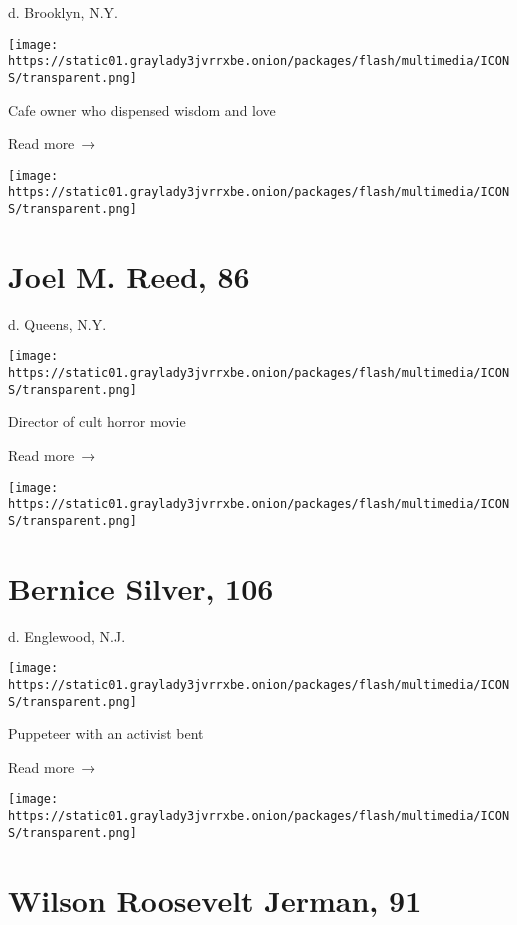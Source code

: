 d. Brooklyn, N.Y.

\texttt{[image: https://static01.graylady3jvrrxbe.onion/packages/flash/multimedia/ICONS/transparent.png]}

Cafe owner who dispensed wisdom and love

 Read more~→

\href{https://www.nytimes3xbfgragh.onion/2020/05/22/obituaries/joel-m-reed-dead-coronavirus.html}{}

\texttt{[image: https://static01.graylady3jvrrxbe.onion/packages/flash/multimedia/ICONS/transparent.png]}

\hypertarget{joel-m-reed-86}{%
\section{Joel M. Reed, 86}\label{joel-m-reed-86}}

d. Queens, N.Y.

\texttt{[image: https://static01.graylady3jvrrxbe.onion/packages/flash/multimedia/ICONS/transparent.png]}

Director of cult horror movie

 Read more~→

\href{https://www.nytimes3xbfgragh.onion/2020/05/21/obituaries/bernice-silver-dead-coronavirus.html}{}

\texttt{[image: https://static01.graylady3jvrrxbe.onion/packages/flash/multimedia/ICONS/transparent.png]}

\hypertarget{bernice-silver-106}{%
\section{Bernice Silver, 106}\label{bernice-silver-106}}

d. Englewood, N.J.

\texttt{[image: https://static01.graylady3jvrrxbe.onion/packages/flash/multimedia/ICONS/transparent.png]}

Puppeteer with an activist bent

 Read more~→

\href{https://www.nytimes3xbfgragh.onion/2020/05/21/us/politics/wilson-jerman-dead-coronavirus.html}{}

\texttt{[image: https://static01.graylady3jvrrxbe.onion/packages/flash/multimedia/ICONS/transparent.png]}

\hypertarget{wilson-roosevelt-jerman-91}{%
\section{Wilson Roosevelt Jerman, 91}\label{wilson-roosevelt-jerman-91}}

